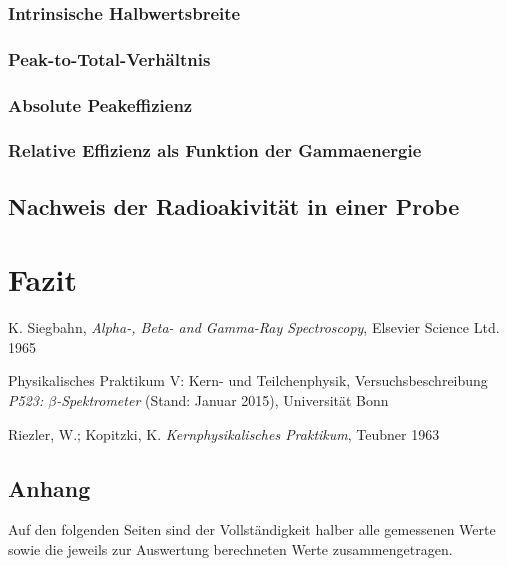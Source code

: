\documentclass[11pt, a4paper]{article}
\numberwithin{equation}{section}
\begin{document}
\subsubsection{Intrinsische Halbwertsbreite}

\subsubsection{Peak-to-Total-Verhältnis}

\subsubsection{Absolute Peakeffizienz}

\subsubsection{Relative Effizienz als Funktion der Gammaenergie}

\subsection{Nachweis der Radioakivität in einer Probe}

\section{Fazit}

\FloatBarrier
\vspace{\fill}
\begin{thebibliography}{19}


	K. Siegbahn,
	\emph{Alpha-, Beta- and Gamma-Ray Spectroscopy},
	Elsevier Science Ltd. 1965

	Physikalisches Praktikum V: Kern- und Teilchenphysik,
	Versuchsbeschreibung \emph{P523: $\beta$-Spektrometer} (Stand: Januar 2015),
	Universität Bonn	

	Riezler, W.; Kopitzki, K.
	\emph{Kernphysikalisches Praktikum},
	Teubner 1963

\end{thebibliography}

\begin{appendix}
\section{Anhang}
Auf den folgenden Seiten sind der Vollständigkeit halber alle gemessenen Werte sowie die jeweils zur Auswertung berechneten Werte zusammengetragen.
\clearpage

\end{appendix}
\end{document}
